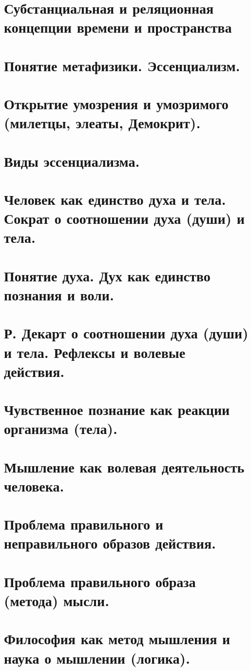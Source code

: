 \section{ Субстанциальная и реляционная концепции времени и пространства}
\section{ Понятие метафизики. Эссенциализм.}
\section{ Открытие умозрения и умозримого (милетцы, элеаты, Демокрит).}
\section{ Виды эссенциализма.}
\section{ Человек как единство духа и тела. Сократ о соотношении духа (души) и тела.}
\section{ Понятие духа. Дух как единство познания и воли.}
\section{ Р. Декарт о соотношении духа (души) и тела. Рефлексы и волевые действия.}
\section{ Чувственное познание как реакции организма (тела).}
\section{ Мышление как волевая деятельность человека.}
\section{ Проблема правильного и неправильного образов действия.}
\section{ Проблема правильного образа (метода) мысли.}
\section{ Философия как метод мышления и наука о мышлении (логика).}
